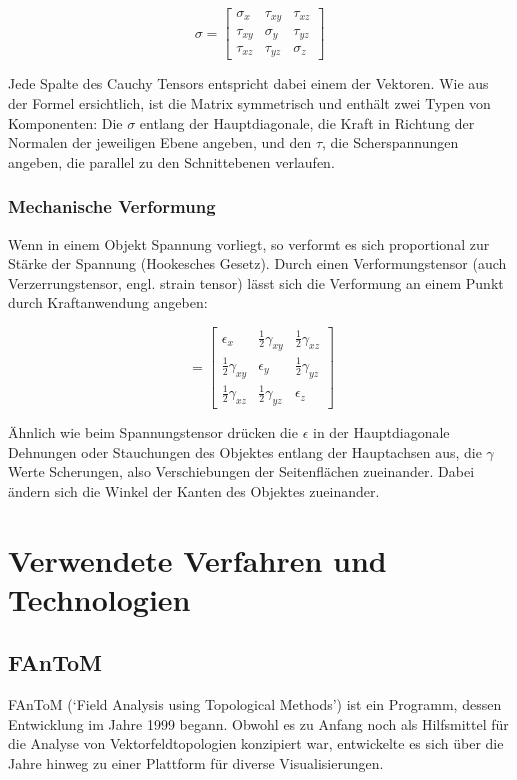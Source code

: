 \documentclass[a4paper,fontsize=12pt,toc=bib,halfparskip]{scrartcl}
\begin{document}
\begin{equation}
	\sigma =  
	\begin{bmatrix}
		\sigma_x & \tau_{xy} & \tau_{xz}\\
		\tau_{xy} & \sigma_y & \tau_{yz}\\
		\tau_{xz} & \tau_{yz} & \sigma_z
	\end{bmatrix}
\end{equation}

Jede Spalte des Cauchy Tensors entspricht dabei einem der Vektoren. Wie aus der Formel ersichtlich, ist die Matrix symmetrisch und enth\"alt zwei Typen von Komponenten: Die $\sigma$ entlang der Hauptdiagonale, die Kraft in Richtung der Normalen der jeweiligen Ebene angeben, und den $\tau$, die Scherspannungen angeben, die parallel zu den Schnittebenen verlaufen. 

\subsubsection{Mechanische Verformung}
Wenn in einem Objekt Spannung vorliegt, so verformt es sich proportional zur St\"arke der Spannung (Hookesches Gesetz). Durch einen Verformungstensor (auch Verzerrungstensor, engl. strain tensor) l\"asst sich die Verformung an einem Punkt durch Kraftanwendung angeben:

\begin{equation}
	\   =  
	\begin{bmatrix}
		\epsilon_x & \frac{1}{2}\gamma_{xy} & \frac{1}{2}\gamma_{xz}\\
		\frac{1}{2}\gamma_{xy} & \epsilon_y & \frac{1}{2}\gamma_{yz}\\
		\frac{1}{2}\gamma_{xz} & \frac{1}{2}\gamma_{yz} & \epsilon_z
	\end{bmatrix}
\end{equation}

\"Ahnlich wie beim Spannungstensor dr\"ucken die $\epsilon$ in der Hauptdiagonale Dehnungen oder Stauchungen des Objektes entlang der Hauptachsen aus, die $\gamma$ Werte Scherungen, also Verschiebungen der Seitenfl\"achen zueinander. Dabei \"andern sich die Winkel der Kanten des Objektes zueinander.

\section{Verwendete Verfahren und Technologien}
\label{sec:Technologien}
\subsection{FAnToM}
FAnToM\cite{fantomWebsite}\cite{wiebel2009fantom} (`Field Analysis using Topological Methods') ist ein Programm, dessen Entwicklung im Jahre 1999 begann. Obwohl es zu Anfang noch als Hilfsmittel f\"ur die Analyse von Vektorfeldtopologien konzipiert war, entwickelte es sich \"uber die Jahre hinweg zu einer Plattform f\"ur diverse Visualisierungen.
\end{document}
